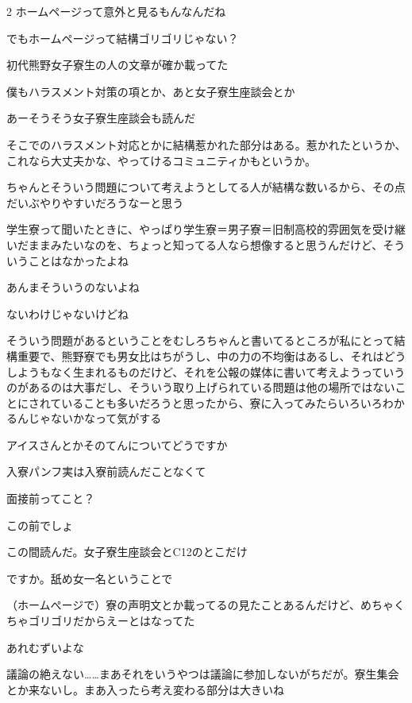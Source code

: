 \begin{multicols}{2}
 ホームページって意外と見るもんなんだね

 でもホームページって結構ゴリゴリじゃない？

 初代熊野女子寮生の人の文章が確か載ってた

 僕もハラスメント対策の項とか、あと女子寮生座談会とか

 あーそうそう女子寮生座談会も読んだ

 そこでのハラスメント対応とかに結構惹かれた部分はある。惹かれたというか、これなら大丈夫かな、やってけるコミュニティかもというか。

 ちゃんとそういう問題について考えようとしてる人が結構な数いるから、その点だいぶやりやすいだろうなーと思う

 学生寮って聞いたときに、やっぱり学生寮＝男子寮＝旧制高校的雰囲気を受け継いだままみたいなのを、ちょっと知ってる人なら想像すると思うんだけど、そういうことはなかったよね

 あんまそういうのないよね

 ないわけじゃないけどね

 そういう問題があるということをむしろちゃんと書いてるところが私にとって結構重要で、熊野寮でも男女比はちがうし、中の力の不均衡はあるし、それはどうしようもなく生まれるものだけど、それを公報の媒体に書いて考えようっていうのがあるのは大事だし、そういう取り上げられている問題は他の場所ではないことにされていることも多いだろうと思ったから、寮に入ってみたらいろいろわかるんじゃないかなって気がする

 アイスさんとかそのてんについてどうですか

 入寮パンフ実は入寮前読んだことなくて

 面接前ってこと？

 この前でしょ

 この間読んだ。女子寮生座談会とC12のとこだけ

 ですか。舐め女一名ということで

 （ホームぺージで）寮の声明文とか載ってるの見たことあるんだけど、めちゃくちゃゴリゴリだからえーとはなってた

 あれむずいよな

 議論の絶えない……まあそれをいうやつは議論に参加しないがちだが。寮生集会とか来ないし。まあ入ったら考え変わる部分は大きいね


\end{multicols}
